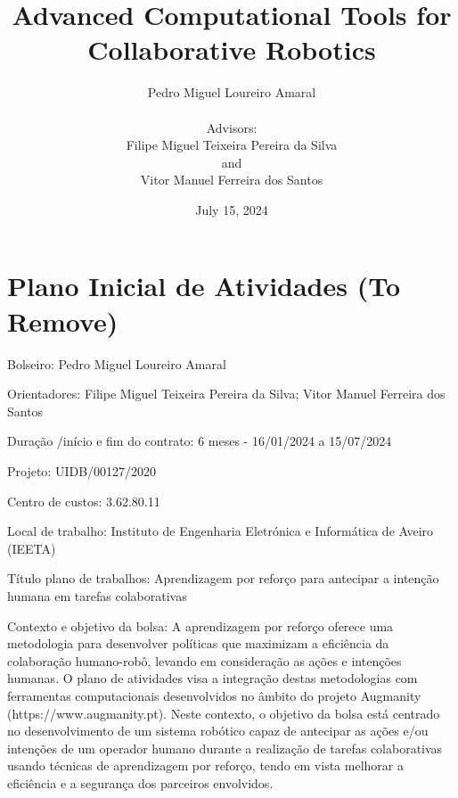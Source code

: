 \documentclass[a4paper]{report}
\title{Advanced Computational Tools for Collaborative Robotics}
\author{
	Pedro Miguel Loureiro Amaral\\
	\\
	Advisors: \\
	Filipe Miguel Teixeira Pereira da Silva\\
	and \\
	Vitor Manuel Ferreira dos Santos}
\date{July 15, 2024}
\begin{document}
\maketitle

\renewcommand\thesection{\arabic{section}}


\tableofcontents

\newpage

\color{red}

\section{Plano Inicial de Atividades (To Remove)}

Bolseiro: Pedro Miguel Loureiro Amaral

Orientadores: Filipe Miguel Teixeira Pereira da Silva; Vitor Manuel Ferreira dos Santos

Duração /início e fim do contrato: 6 meses - 16/01/2024 a 15/07/2024

Projeto: UIDB/00127/2020

Centro de custos: 3.62.80.11

Local de trabalho: Instituto de Engenharia Eletrónica e Informática de Aveiro (IEETA)

Título plano de trabalhos: Aprendizagem por reforço para antecipar a intenção humana em tarefas colaborativas

Contexto e objetivo da bolsa: A aprendizagem por reforço oferece uma metodologia para desenvolver políticas que maximizam a eficiência da colaboração humano-robô, levando em consideração as ações e intenções humanas. O plano de atividades visa a integração destas metodologias com ferramentas computacionais desenvolvidos no âmbito do projeto Augmanity (https://www.augmanity.pt). Neste contexto, o objetivo da bolsa está centrado no desenvolvimento de um sistema robótico capaz de antecipar as ações e/ou intenções de um operador humano durante a realização de tarefas colaborativas usando técnicas de aprendizagem por reforço, tendo em vista melhorar a eficiência e a segurança dos parceiros envolvidos.
\end{document}
